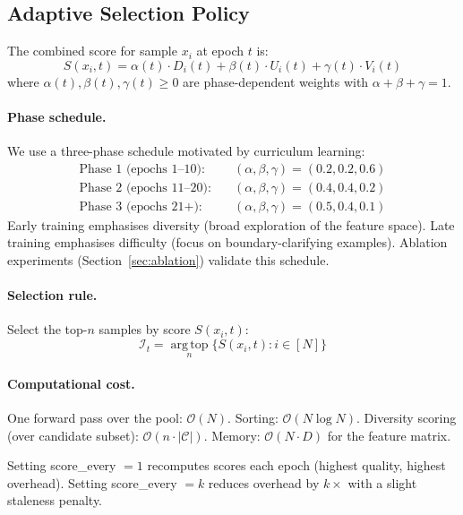 \documentclass[10pt,twocolumn]{article}
\begin{document}
\subsection{Adaptive Selection Policy}

The combined score for sample $x_i$ at epoch $t$ is:
\begin{equation}
  S(x_i, t) = \alpha(t) \cdot D_i(t) + \beta(t) \cdot U_i(t) + \gamma(t) \cdot V_i(t)
  \label{eq:score}
\end{equation}
where $\alpha(t), \beta(t), \gamma(t) \geq 0$ are phase-dependent weights
with $\alpha + \beta + \gamma = 1$.

\paragraph{Phase schedule.}
We use a three-phase schedule motivated by curriculum learning:
\begin{align}
  \text{Phase 1 (epochs 1--10):} &\quad (\alpha, \beta, \gamma) = (0.2, 0.2, 0.6) \\
  \text{Phase 2 (epochs 11--20):} &\quad (\alpha, \beta, \gamma) = (0.4, 0.4, 0.2) \\
  \text{Phase 3 (epochs 21+):} &\quad (\alpha, \beta, \gamma) = (0.5, 0.4, 0.1)
\end{align}
Early training emphasises diversity (broad exploration of the feature space).
Late training emphasises difficulty (focus on boundary-clarifying examples).
Ablation experiments (Section~\ref{sec:ablation}) validate this schedule.

\paragraph{Selection rule.}
Select the top-$n$ samples by score $S(x_i, t)$:
\begin{equation}
  \mathcal{I}_t = \operatorname*{arg\,top}_n \{ S(x_i, t) : i \in [N] \}
\end{equation}

\paragraph{Computational cost.}
One forward pass over the pool: $\mathcal{O}(N)$.
Sorting: $\mathcal{O}(N \log N)$.
Diversity scoring (over candidate subset): $\mathcal{O}(n \cdot |\mathcal{C}|)$.
Memory: $\mathcal{O}(N \cdot D)$ for the feature matrix.

Setting score\_every $= 1$ recomputes scores each epoch (highest quality,
highest overhead). Setting score\_every $= k$ reduces overhead by $k\times$
with a slight staleness penalty.
\end{document}
